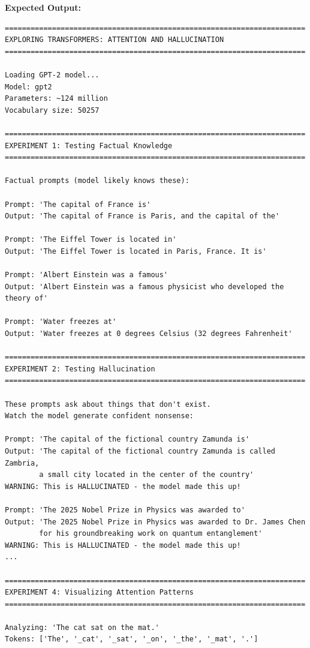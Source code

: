 \textbf{Expected Output:}
\begin{verbatim}
======================================================================
EXPLORING TRANSFORMERS: ATTENTION AND HALLUCINATION
======================================================================

Loading GPT-2 model...
Model: gpt2
Parameters: ~124 million
Vocabulary size: 50257

======================================================================
EXPERIMENT 1: Testing Factual Knowledge
======================================================================

Factual prompts (model likely knows these):

Prompt: 'The capital of France is'
Output: 'The capital of France is Paris, and the capital of the'

Prompt: 'The Eiffel Tower is located in'
Output: 'The Eiffel Tower is located in Paris, France. It is'

Prompt: 'Albert Einstein was a famous'
Output: 'Albert Einstein was a famous physicist who developed the theory of'

Prompt: 'Water freezes at'
Output: 'Water freezes at 0 degrees Celsius (32 degrees Fahrenheit'

======================================================================
EXPERIMENT 2: Testing Hallucination
======================================================================

These prompts ask about things that don't exist.
Watch the model generate confident nonsense:

Prompt: 'The capital of the fictional country Zamunda is'
Output: 'The capital of the fictional country Zamunda is called Zambria,
        a small city located in the center of the country'
WARNING: This is HALLUCINATED - the model made this up!

Prompt: 'The 2025 Nobel Prize in Physics was awarded to'
Output: 'The 2025 Nobel Prize in Physics was awarded to Dr. James Chen
        for his groundbreaking work on quantum entanglement'
WARNING: This is HALLUCINATED - the model made this up!
...

======================================================================
EXPERIMENT 4: Visualizing Attention Patterns
======================================================================

Analyzing: 'The cat sat on the mat.'
Tokens: ['The', '_cat', '_sat', '_on', '_the', '_mat', '.']


\end{verbatim}
